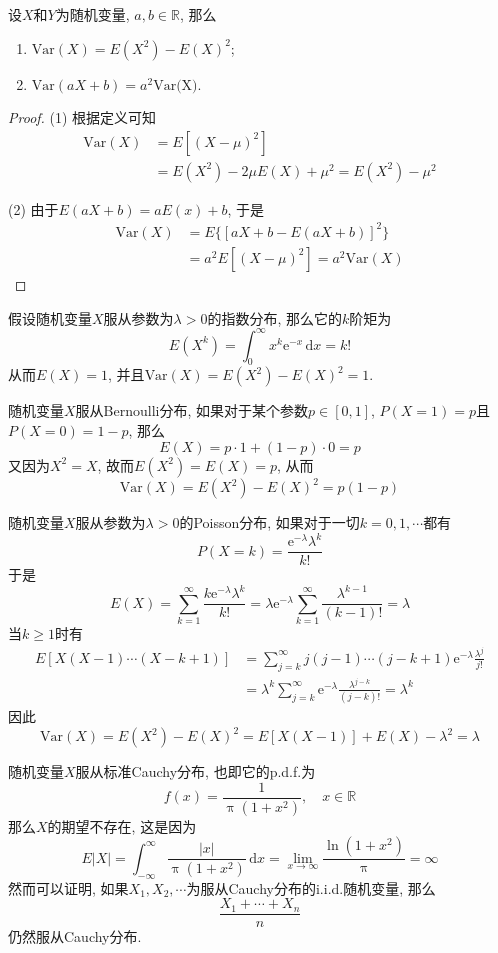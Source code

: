 \documentclass[cn, 12pt, math=mtpro2, bibstyle=apa, blue, twocol]{elegantbook}
\newcommand{\R}{\mathbb{R}}
\begin{document}
\begin{theorem}
  设$X$和$Y$为随机变量, $a,b\in \R$, 那么
  \begin{enumerate}[label=(\arabic*)]
    \item $\text{Var}(X)=E(X^2)-E(X)^2$;
    \item $\text{Var}(aX+b)=a^2\text{Var(X)}$.
  \end{enumerate}
\end{theorem}
\begin{proof}
  (1) 根据定义可知
  \begin{align*}
  \text{Var}(X)&=E[(X-\mu)^2] \\
  &=E(X^2)-2\mu E(X)+\mu^2=E(X^2)-\mu^2
  \end{align*}

  (2) 由于$E(aX+b)=aE(x)+b$, 于是
  \begin{align*}
  \text{Var}(X)&=E\{[aX+b-E(aX+b)]^2\} \\
  &=a^2E[(X-\mu)^2]=a^2\text{Var}(X)
  \end{align*}
\end{proof}

\begin{example}
假设随机变量$X$服从参数为$\lambda>0$的指数分布, 那么它的$k$阶矩为
$$E(X^k)=\int_{0}^{\infty}x^k\text{e}^{-x}\,\text{d}x=k!$$
从而$E(X)=1$, 并且$\text{Var}(X)=E(X^2)-E(X)^2=1$.
\end{example}

\begin{example}
随机变量$X$服从Bernoulli分布, 如果对于某个参数$p\in[0,1]$, $P(X=1)=p$且$P(X=0)=1-p$, 那么
$$E(X)=p\cdot 1+(1-p)\cdot 0=p$$
又因为$X^2=X$, 故而$E(X^2)=E(X)=p$, 从而
$$\text{Var}(X)=E(X^2)-E(X)^2=p(1-p)$$
\end{example}

\begin{example}
随机变量$X$服从参数为$\lambda>0$的Poisson分布, 如果对于一切$k=0,1,\cdots$都有
$$P(X=k)=\frac{\text{e}^{-\lambda}\lambda^k}{k!}$$
于是
$$E(X)=\sum_{k=1}^{\infty}\frac{k\text{e}^{-\lambda}\lambda^k}{k!}=\lambda\text{e}^{-\lambda}\sum_{k=1}^{\infty}\frac{\lambda^{k-1}}{(k-1)!}=\lambda$$
当$k\geq1$时有
\begin{align*}
E[X(X-1)\cdots(X-k+1)]&=\sum_{j=k}^{\infty}j(j-1)\cdots(j-k+1)\text{e}^{-\lambda}\frac{\lambda^j}{j!} \\
&=\lambda^k\sum_{j=k}^{\infty}\text{e}^{-\lambda}\frac{\lambda^{j-k}}{(j-k)!}=\lambda^k
\end{align*}
因此
$$\text{Var}(X)=E(X^2)-E(X)^2=E[X(X-1)]+E(X)-\lambda^2=\lambda$$

\end{example}
\begin{example}
随机变量$X$服从标准Cauchy分布, 也即它的p.d.f.为
$$f(x)=\frac{1}{\uppi(1+x^2)},\quad x\in\R$$
那么$X$的期望不存在, 这是因为
$$E|X|=\int_{-\infty}^{\infty}\frac{|x|}{\uppi(1+x^2)}\,\text{d}x=\lim_{x\to\infty}\frac{\ln (1+x^2)}{\uppi}=\infty$$
然而可以证明, 如果$X_1,X_2,\cdots$为服从Cauchy分布的i.i.d.随机变量, 那么
$$\frac{X_1+\cdots+X_n}{n}$$
仍然服从Cauchy分布.
\end{example}
\end{document}

